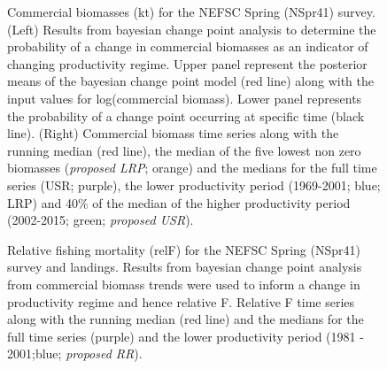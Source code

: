 \documentclass[11pt]{article}
\newcommand{\e}{/backup/bio_data/bio.lobster/figures/} %
\begin{document}
\begin{landscape}
\begin{figure}
\centering
       \caption{Commercial biomasses (kt) for the NEFSC Spring (NSpr41) survey. (Left) Results from bayesian change point analysis to determine the probability of a change in commercial biomasses as an indicator of changing productivity regime. Upper panel represent the posterior means of the bayesian change point model (red line) along with the input values for log(commercial biomass). Lower panel represents the probability of a change point occurring at specific time (black line). (Right) Commercial biomass time series along with the running median (red line), the median of the five lowest non zero biomasses (\emph{proposed LRP}; orange) and the medians for the full time series (USR; purple), the lower productivity period (1969-2001; blue; LRP) and 40\% of the median of the higher productivity period (2002-2015; green; \emph{proposed USR}). }

\end{figure}
\end{landscape}
     \clearpage


\begin{figure}
\centering
       \caption{Relative fishing mortality (relF) for the NEFSC Spring (NSpr41) survey and landings. Results from bayesian change point analysis from commercial biomass trends were used to inform a change in productivity regime and hence relative F. Relative F time series along with the running median (red line) and the medians for the full time series (purple) and the lower productivity period (1981 - 2001;blue; \emph{proposed RR}). }
\end{figure}
\end{document}

